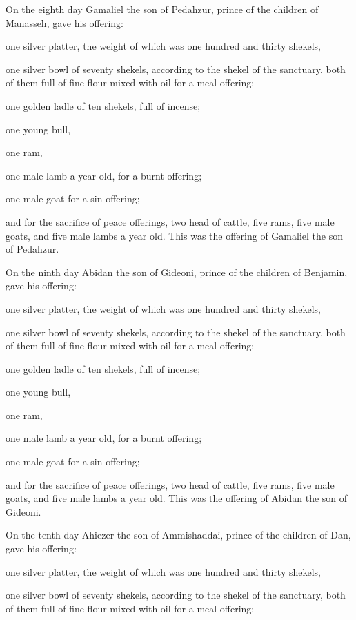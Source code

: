  On the eighth day Gamaliel the son of Pedahzur, prince of
the children of Manasseh,  gave his offering:

one silver platter, the weight of which was one hundred and thirty
shekels,

one silver bowl of seventy shekels, according to the shekel of the
sanctuary, both of them full of fine flour mixed with oil for a meal
offering;

 one golden ladle of ten shekels, full of incense;

 one young bull,

one ram,

one male lamb a year old, for a burnt offering;

 one male goat for a sin offering;

 and for the sacrifice of peace offerings, two head of
cattle, five rams, five male goats, and five male lambs a year old. This
was the offering of Gamaliel the son of Pedahzur.

 On the ninth day Abidan the son of Gideoni, prince of the
children of Benjamin,  gave his offering:

one silver platter, the weight of which was one hundred and thirty
shekels,

one silver bowl of seventy shekels, according to the shekel of the
sanctuary, both of them full of fine flour mixed with oil for a meal
offering;

 one golden ladle of ten shekels, full of incense;

 one young bull,

one ram,

one male lamb a year old, for a burnt offering;

 one male goat for a sin offering;

 and for the sacrifice of peace offerings, two head of
cattle, five rams, five male goats, and five male lambs a year old. This
was the offering of Abidan the son of Gideoni.

 On the tenth day Ahiezer the son of Ammishaddai, prince of
the children of Dan,  gave his offering:

one silver platter, the weight of which was one hundred and thirty
shekels,

one silver bowl of seventy shekels, according to the shekel of the
sanctuary, both of them full of fine flour mixed with oil for a meal
offering;


